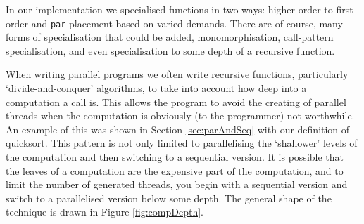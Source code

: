 In our implementation we specialised functions in two ways: higher-order to
first-order and \verb|par| placement based on varied demands. There are of
course, many forms of specialisation that could be added, monomorphisation,
call-pattern specialisation, and even specialisation to some depth of a
recursive function. 

%

When writing parallel programs we often write recursive functions, particularly
`divide-and-conquer' algorithms, to take into account how deep into a
computation a call is. This allows the program to avoid the creating of
parallel threads when the computation is obviously (to the programmer) not
worthwhile. An example of this was shown in Section \ref{sec:parAndSeq} with
our definition of \<quicksort\>. This pattern is not only limited to
parallelising the `shallower' levels of the computation and then switching to a
sequential version. It is possible that the leaves of a computation are the
expensive part of the computation, and to limit the number of generated
threads, you begin with a sequential version and switch to a parallelised
version below some depth. The general shape of the technique is drawn in Figure
\ref{fig:compDepth}.


